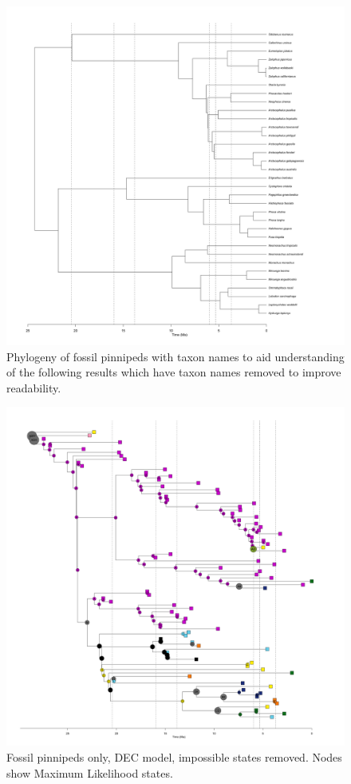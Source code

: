 \documentclass[a4paper, 12pt]{article}
\begin{document}
\begin{figure}[H]
 \centering
  \includegraphics[width = \linewidth]{figures/fossil-pinnipeds-tree.png}
  \caption{Phylogeny of fossil pinnipeds with taxon names to aid understanding of the following results which have taxon names removed to improve readability.}
  \label{fig-fossil-tree}
\end{figure} 

\begin{figure}[H]
 \centering
  \includegraphics[width = \linewidth]{figures/fossil-pinnipeds-DEC-impossible-MLstates.png}
  \caption{Fossil pinnipeds only, DEC model, impossible states removed. Nodes show Maximum Likelihood states.}
  \label{fig-fossil-dec-ml}
\end{figure} 
\end{document}

